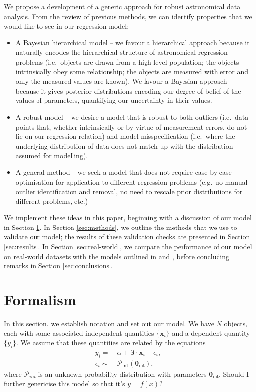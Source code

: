 \documentclass[fleqn,usenatbib]{mnras}
\begin{document}
We propose a development of a generic approach for robust astronomical data
analysis. From the review of previous methods, we can identify properties that
we would like to see in our regression model:

\begin{itemize}
	\item A Bayesian hierarchical model -- we favour a hierarchical approach
	because it naturally encodes the hierarchical structure of astronomical
	regression problems (i.e.\ objects are drawn from a high-level population;
	the objects intrinsically obey some relationship; the objects are measured
	with error and only the measured values are known). We favour a Bayesian
	approach because it gives posterior distributions encoding our degree of
	belief of the values of parameters, quantifying our uncertainty in their
	values.

	\item A robust model -- we desire a model that is robust to both outliers
	(i.e.\ data points that, whether intrinsically or by virtue of measurement
	errors, do not lie on our regression relation) and model misspecification
	(i.e.\ where the underlying distribution of data does not match up with the
	distribution assumed for modelling).

	\item A general method -- we seek a model that does not require case-by-case
	optimisation for application to different regression problems (e.g.\ no
	manual outlier identification and removal, no need to rescale prior
	distributions for different problems, etc.)
\end{itemize}

We implement these ideas in this paper, beginning with a discussion of our model
in Section \ref{sec:formalism}. In Section \ref{sec:methods}, we outline the
methods that we use to validate our model; the results of these validation
checks are presented in Section \ref{sec:results}. In Section
\ref{sec:real-world}, we compare the performance of our model on real-world
datasets with the models outlined in \citet{Kelly:2007} and \citet{Park:2017},
before concluding remarks in Section \ref{sec:conclusions}.

\section{Formalism}
\label{sec:formalism}

In this section, we establish notation and set out our model. We
have $N$ objects, each with some associated independent quantities
$\{\boldsymbol{x}_i\}$ and a dependent quantity $\{y_i\}$. We assume that these
quantities are related by the equations
\begin{align}
    y_i =&\; \alpha + \boldsymbol{\beta} \cdot \boldsymbol{x}_i + \epsilon_i, \\
    \epsilon_i \sim&\; \mathcal{P}_{\text{int}} \left( \boldsymbol{\theta}_{\text{int}} \right),
\end{align}
where $\mathcal{P}_{int}$ is an unknown probability distribution with parameters
$\boldsymbol{\theta}_{\text{int}}$. {\color{red} Should I further genericise
this model so that it's $y = f(x)$?}
\end{document}
